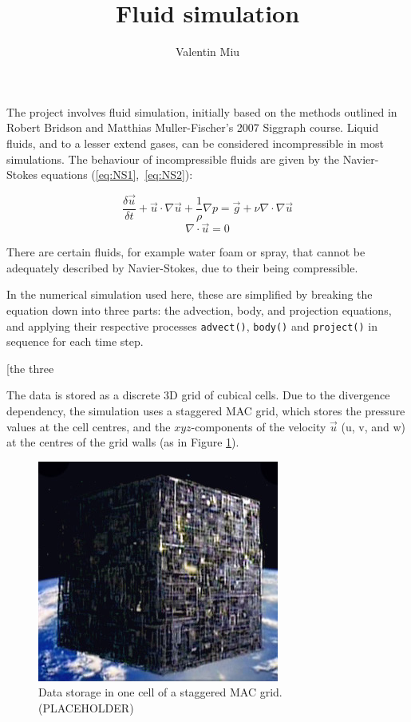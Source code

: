 \documentclass[12pt]{article}
\title{Fluid simulation}
\author{Valentin Miu}
\date{}
\begin{document}
\maketitle

The project involves fluid simulation, initially based on the methods outlined in Robert Bridson and Matthias Muller-Fischer's 2007 Siggraph course.
Liquid fluids, and to a lesser extend gases, can be considered incompressible in most simulations. The behaviour of incompressible fluids are given by the Navier-Stokes equations (\ref{eq:NS1},~\ref{eq:NS2}):

\begin{equation}
\frac{\delta\vec{u}}{\delta t}+\vec{u}\cdot\nabla\vec{u}+\frac{1}{\rho}\nabla p=\vec{g}+\nu\nabla\cdot\nabla\vec{u}
\label{eq:NS1}
\end{equation}
\begin{equation}
\nabla\cdot\vec{u}=0
\label{eq:NS2}
\end{equation}

There are certain fluids, for example water foam or spray, that cannot be adequately described by Navier-Stokes, due to their being compressible.

In the numerical simulation used here, these are simplified by breaking the equation down into three parts: the advection, body, and projection equations, and applying their respective processes \texttt{advect()}, \texttt{body()} and \texttt{project()} in sequence for each time step.

[the three 

The data is stored as a discrete 3D grid of cubical cells. Due to the divergence dependency, the simulation uses a staggered MAC grid, which stores the pressure values at the cell centres, and the $xyz$-components of the velocity $\vec{u}$ (u, v, and w) at the centres of the grid walls (as in Figure \ref{fig:MACgrid}).

\begin{figure}[h]
\centering
\includegraphics[width=0.3\linewidth]{Borg_cube_orbits_Earth.jpg}
\caption{Data storage in one cell of a staggered MAC grid. (PLACEHOLDER)}
\label{fig:MACgrid}
\end{figure}
\end{document}
